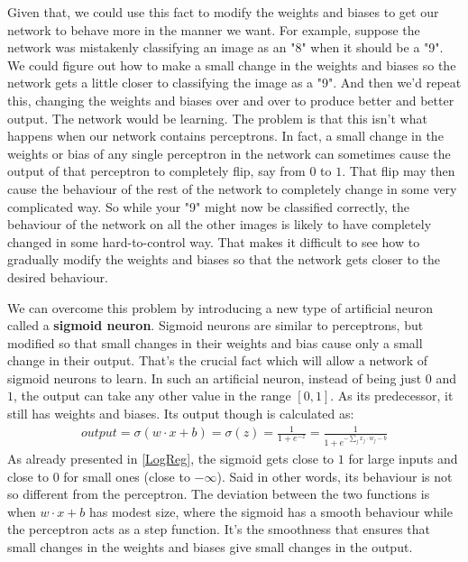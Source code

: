 \documentclass[12pt, letterpaper]{article}
\theoremstyle{definition}
\let\tb\textbf
\begin{document}
Given that, we could use this fact to modify the weights and biases to get our network to behave more in the manner we want. For example, suppose the network was mistakenly classifying an image as an "8" when it should be a "9". We could figure out how to make a small change in the weights and biases so the network gets a little closer to classifying the image as a "9". And then we'd repeat this, changing the weights and biases over and over to produce better and better output. The network would be learning. The problem is that this isn't what happens when our network contains perceptrons. In fact, a small change in the weights or bias of any single perceptron in the network can sometimes cause the output of that perceptron to completely flip, say from $0$ to $1$. That flip may then cause the behaviour of the rest of the network to completely change in some very complicated way. So while your "9" might now be classified correctly, the behaviour of the network on all the other images is likely to have completely changed in some hard-to-control way. That makes it difficult to see how to gradually modify the weights and biases so that the network gets closer to the desired behaviour.

We can overcome this problem by introducing a new type of artificial neuron called a \tb{sigmoid neuron}. Sigmoid neurons are similar to perceptrons, but modified so that small changes in their weights and bias cause only a small change in their output. That's the crucial fact which will allow a network of sigmoid neurons to learn. In such an artificial neuron, instead of being just $0$ and $1$, the output can take any other value in the range $[0,1]$. As its predecessor, it still has weights and biases. Its output though is calculated as:
\begin{equation}
\begin{aligned}
\textit{output} = \sigma(w\cdot x+b) = \sigma(z) = \frac{1}{1+e^{-z}} = \frac{1}{1+e^{-\sum_j x_j \cdot w_j -b}} 
\end{aligned}
\end{equation}
As already presented in \autoref{LogReg}, the sigmoid gets close to $1$ for large inputs and close to $0$ for small ones (close to $-\infty$). Said in other words, its behaviour is not so different from the perceptron. The deviation between the two functions is when $w\cdot x +b$ has modest size, where the sigmoid has a smooth behaviour while the perceptron acts as a step function. It's the smoothness that ensures that small changes in the weights and biases give small changes in the output.
\end{document}
